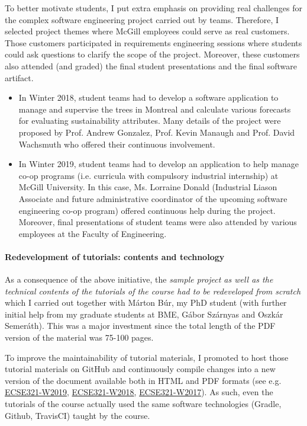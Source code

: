\documentclass[a4paper,11pt]{article}
\begin{document}
To better motivate students, I put extra emphasis on providing real challenges for the complex software engineering project carried out by teams. Therefore, I selected project themes where McGill employees could serve as real customers. Those customers participated in requirements engineering sessions where students could ask questions to clarify the scope of the project. Moreover, these customers also attended (and graded) the final student presentations and the final software artifact.
\begin{itemize}
\item In Winter 2018, student teams had to develop a software application to manage and supervise the trees in Montreal and calculate various forecasts for evaluating sustainability attributes. Many details of the project were proposed by Prof. Andrew Gonzalez, Prof. Kevin Manaugh and Prof. David Wachsmuth who offered their continuous involvement.
\item In Winter 2019, student teams had to develop an application to help manage co-op programs (i.e. curricula with compulsory industrial internship) at McGill University. In this case, Ms. Lorraine Donald (Industrial Liason Associate and future administrative coordinator of the upcoming software engineering co-op program) offered continuous help during the project. Moreover, final presentations of student teams were also attended by various employees at the Faculty of Engineering.
\end{itemize}


\paragraph{Redevelopment of tutorials: contents and technology}
As a consequence of the above initiative, the \emph{sample project as well as the technical contents of the tutorials of the course had to be redeveloped from scratch} which I carried out together with Márton Búr, my PhD student (with further initial help from my graduate students at BME, Gábor Szárnyas and Oszkár Semeráth). This was a major investment since the total length of the PDF version of the material was 75-100 pages. 

To improve the maintainability of tutorial materials, I promoted to host those tutorial materials on GitHub and continuously compile changes into a new version of the document available both in HTML and PDF formats (see e.g. 
\href{https://mcgill-ecse321-winter2019.github.io/EventRegistration-Tutorials/}{ECSE321-W2019}, 
\href{https://mcgill-ecse321-winter2018.github.io/EventRegistration-Tutorials/}{ECSE321-W2018}, 
\href{https://ecse321-winter2017-mcgill.github.io/EventRegistration-Tutorials/}{ECSE321-W2017}). As such, even the tutorials of the course actually used the same software technologies (Gradle, Github, TravisCI) taught by the course. 
\end{document}
